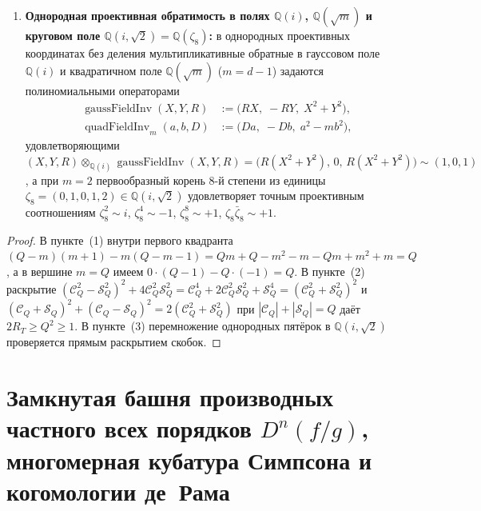 \begin{theorem}
\begin{enumerate}[label=\textbf{(\arabic*)},leftmargin=*]
\begin{align}
  \end{align}
\item \textbf{Однородная проективная обратимость в полях $\mathbb{Q}(i)$, $\mathbb{Q}(\sqrt{m})$ и круговом поле $\mathbb{Q}(i,\sqrt{2}) = \mathbb{Q}(\zeta_8)$:}
  в однородных проективных координатах без деления мультипликативные обратные в гауссовом поле $\mathbb{Q}(i)$ и квадратичном поле $\mathbb{Q}(\sqrt{m})$ ($m = d - 1$) задаются полиномиальными операторами
  \begin{align}
    \operatorname{gaussFieldInv}(X, Y, R) &:= \bigl(R X,\; -R Y,\; X^2 + Y^2\bigr), \label{eq:math-gauss-inv} \\
    \operatorname{quadFieldInv}_m(a, b, D) &:= \bigl(D a,\; -D b,\; a^2 - m b^2\bigr), \label{eq:math-quad-inv}
  \end{align}
  удовлетворяющими $(X, Y, R)\otimes_{\mathbb{Q}(i)}\operatorname{gaussFieldInv}(X, Y, R) = \bigl(R(X^2+Y^2),\, 0,\, R(X^2+Y^2)\bigr) \sim (1, 0, 1)$, а при $m = 2$ первообразный корень $8$-й степени из единицы $\zeta_8 = (0, 1, 0, 1, 2) \in \mathbb{Q}(i,\sqrt{2})$ удовлетворяет точным проективным соотношениям $\zeta_8^2 \sim i$, $\zeta_8^4 \sim -1$, $\zeta_8^8 \sim +1$, $\zeta_8\bar{\zeta}_8 \sim +1$.
\end{enumerate}
\end{theorem}

\begin{proof}
\leanok
В пункте~(1) внутри первого квадранта $(Q - m)(m + 1) - m(Q - m - 1) = Q m + Q - m^2 - m - Q m + m^2 + m = Q$, а в вершине $m = Q$ имеем $0\cdot(Q-1) - Q\cdot(-1) = Q$. В пункте~(2) раскрытие $(\mathcal{C}_Q^2 - \mathcal{S}_Q^2)^2 + 4\mathcal{C}_Q^2\mathcal{S}_Q^2 = \mathcal{C}_Q^4 + 2\mathcal{C}_Q^2\mathcal{S}_Q^2 + \mathcal{S}_Q^4 = (\mathcal{C}_Q^2 + \mathcal{S}_Q^2)^2$ и $(\mathcal{C}_Q + \mathcal{S}_Q)^2 + (\mathcal{C}_Q - \mathcal{S}_Q)^2 = 2(\mathcal{C}_Q^2 + \mathcal{S}_Q^2)$ при $|\mathcal{C}_Q| + |\mathcal{S}_Q| = Q$ даёт $2 R_T \ge Q^2 \ge 1$. В пункте~(3) перемножение однородных пятёрок в $\mathbb{Q}(i,\sqrt{2})$ проверяется прямым раскрытием скобок.
\end{proof}

\section{Замкнутая башня производных частного всех порядков \texorpdfstring{$D^n(f/g)$}{D\^{}n(f/g)}, многомерная кубатура Симпсона и когомологии де~Рама}

